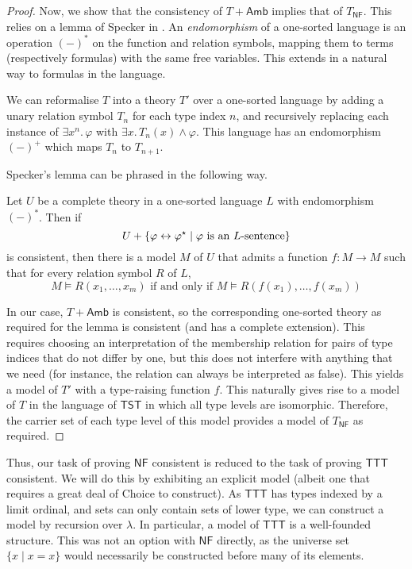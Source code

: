 \begin{proof}
    Now, we show that the consistency of \( T + \mathsf{Amb} \) implies that of \( T_{\mathsf{NF}} \).
    This relies on a lemma of Specker in \cite{typical-ambiguity}.
    An \emph{endomorphism} of a one-sorted language is an operation \( (-)^\ast \) on the function and relation symbols, mapping them to terms (respectively formulas) with the same free variables.
    This extends in a natural way to formulas in the language.

    We can reformalise \( T \) into a theory \( T' \) over a one-sorted language by adding a unary relation symbol \( T_n \) for each type index \( n \), and recursively replacing each instance of \( \exists x^n.\, \varphi \) with \( \exists x.\, T_n(x) \wedge \varphi \).
    This language has an endomorphism \( (-)^+ \) which maps \( T_n \) to \( T_{n+1} \).

    Specker's lemma can be phrased in the following way.
    \begin{lemma}
        Let \( U \) be a complete theory in a one-sorted language \( L \) with endomorphism \( (-)^\ast \).
        Then if
        \[ U + \{ \varphi \leftrightarrow \varphi^\star \mid \varphi \text{ is an \( L \)-sentence} \} \]
        is consistent, then there is a model \( M \) of \( U \) that admits a function \( f : M \to M \) such that for every relation symbol \( R \) of \( L \),
        \[ M \vDash R(x_1, \dots, x_m) \text{ if and only if } M \vDash R(f(x_1), \dots, f(x_m)) \]
    \end{lemma}
    In our case, \( T + \mathsf{Amb} \) is consistent, so the corresponding one-sorted theory as required for the lemma is consistent (and has a complete extension).
    This requires choosing an interpretation of the membership relation for pairs of type indices that do not differ by one, but this does not interfere with anything that we need (for instance, the relation can always be interpreted as false).
    This yields a model of \( T' \) with a type-raising function \( f \).
    This naturally gives rise to a model of \( T \) in the language of \( \mathsf{TST} \) in which all type levels are isomorphic.
    Therefore, the carrier set of each type level of this model provides a model of \( T_{\mathsf{NF}} \) as required.
\end{proof}

Thus, our task of proving \( \mathsf{NF} \) consistent is reduced to the task of proving \( \mathsf{TTT} \) consistent.
We will do this by exhibiting an explicit model (albeit one that requires a great deal of Choice to construct).
As \( \mathsf{TTT} \) has types indexed by a limit ordinal, and sets can only contain sets of lower type, we can construct a model by recursion over \( \lambda \).
In particular, a model of \( \mathsf{TTT} \) is a well-founded structure.
This was not an option with \( \mathsf{NF} \) directly, as the universe set \( \{ x \mid x = x \} \) would necessarily be constructed before many of its elements.

